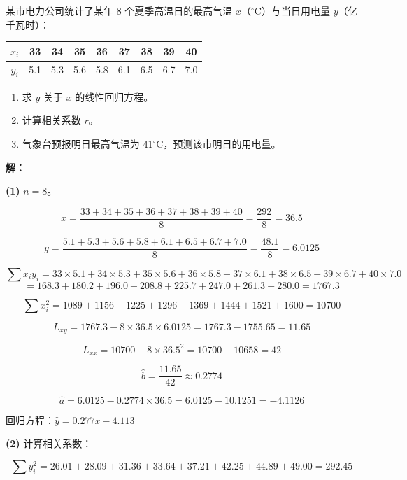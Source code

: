 \documentclass[12pt, a4paper]{ctexart}
\begin{document}
\begin{appbox}[【应用3】气温与用电量]
某市电力公司统计了某年 $8$ 个夏季高温日的最高气温 $x$（$^\circ$C）与当日用电量 $y$（亿千瓦时）：

\begin{center}
\begin{tabular}{c|cccccccc}
\toprule
$x_i$ & 33 & 34 & 35 & 36 & 37 & 38 & 39 & 40 \\
\midrule
$y_i$ & 5.1 & 5.3 & 5.6 & 5.8 & 6.1 & 6.5 & 6.7 & 7.0 \\
\bottomrule
\end{tabular}
\end{center}

\begin{enumerate}[label=(\arabic*)]
  \item 求 $y$ 关于 $x$ 的线性回归方程。
  \item 计算相关系数 $r$。
  \item 气象台预报明日最高气温为 $41^\circ$C，预测该市明日的用电量。
\end{enumerate}
\end{appbox}

\textbf{解：}

\textbf{(1)} $n = 8$。

\[
\bar{x} = \frac{33+34+35+36+37+38+39+40}{8} = \frac{292}{8} = 36.5
\]

\[
\bar{y} = \frac{5.1+5.3+5.6+5.8+6.1+6.5+6.7+7.0}{8} = \frac{48.1}{8} = 6.0125
\]

\[
\sum x_iy_i = 33\times5.1 + 34\times5.3 + 35\times5.6 + 36\times5.8 + 37\times6.1 + 38\times6.5 + 39\times6.7 + 40\times7.0
\]
\[
= 168.3 + 180.2 + 196.0 + 208.8 + 225.7 + 247.0 + 261.3 + 280.0 = 1767.3
\]

\[
\sum x_i^2 = 1089 + 1156 + 1225 + 1296 + 1369 + 1444 + 1521 + 1600 = 10700
\]

\[
L_{xy} = 1767.3 - 8 \times 36.5 \times 6.0125 = 1767.3 - 1755.65 = 11.65
\]

\[
L_{xx} = 10700 - 8 \times 36.5^2 = 10700 - 10658 = 42
\]

\[
\hat{b} = \frac{11.65}{42} \approx 0.2774
\]

\[
\hat{a} = 6.0125 - 0.2774 \times 36.5 = 6.0125 - 10.1251 = -4.1126
\]

回归方程：$\boxed{\hat{y} = 0.277x - 4.113}$

\medskip
\textbf{(2)} 计算相关系数：

\[
\sum y_i^2 = 26.01 + 28.09 + 31.36 + 33.64 + 37.21 + 42.25 + 44.89 + 49.00 = 292.45
\]
\end{document}
